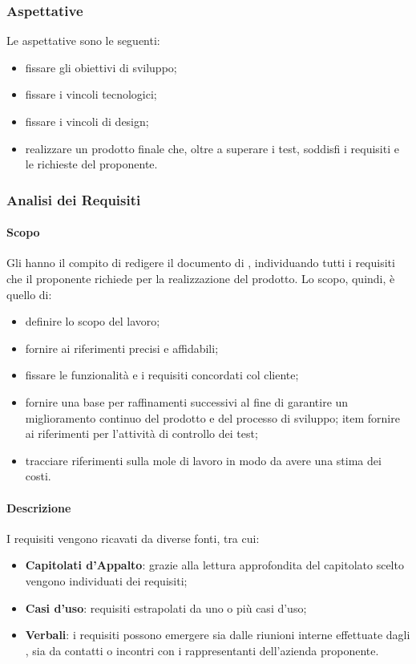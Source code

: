 \subsubsection{Aspettative}
Le aspettative sono le seguenti:
\begin{itemize}
	\item fissare gli obiettivi di sviluppo;
	\item fissare i vincoli tecnologici;
	\item fissare i vincoli di design;
	\item realizzare un prodotto finale che,  oltre a superare i test,  soddisfi i requisiti e le richieste del proponente.
\end{itemize}
\subsubsection{Analisi dei Requisiti}
\paragraph{Scopo}
Gli \anas{} hanno il compito di redigere il documento di \AdR{}, individuando tutti i requisiti che il proponente richiede per la realizzazione del prodotto.  Lo scopo,  quindi,  è quello di:
\begin{itemize}
	\item definire lo scopo del lavoro;
	\item fornire ai \progs{} riferimenti precisi e affidabili;
	\item fissare le funzionalità e i requisiti concordati col cliente;
	\item fornire una base per raffinamenti successivi al fine di garantire un miglioramento continuo del prodotto e del processo di sviluppo;
	item fornire ai \vers{} riferimenti per l'attività di controllo dei test;
	\item tracciare riferimenti sulla mole di lavoro in modo da avere una stima dei costi.
\end{itemize}
\paragraph{Descrizione}
I requisiti vengono ricavati da diverse fonti,  tra cui:
\begin{itemize}
	\item \textbf{Capitolati d'Appalto}: grazie alla lettura approfondita del capitolato scelto vengono individuati dei requisiti;
	\item \textbf{Casi d'uso}: requisiti estrapolati da uno o più casi d'uso; 
	\item \textbf{Verbali}: i requisiti possono emergere sia dalle riunioni interne effettuate dagli \anas{}, sia da contatti o incontri con i rappresentanti dell'azienda proponente.
\end{itemize}
